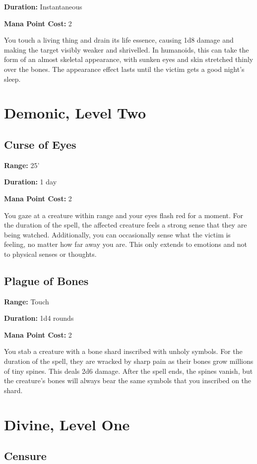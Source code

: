 \begin{multicols}{2}
\textbf{Duration:} Instantaneous

\textbf{Mana Point Cost:} 2

You touch a living thing and drain its life essence, causing 1d8
damage and making the target visibly weaker and shrivelled. In
humanoids, this can take the form of an almost skeletal appearance,
with sunken eyes and skin stretched thinly over the bones. The
appearance effect lasts until the victim gets a good night's sleep.

\section{Demonic, Level Two}

\subsection{Curse of Eyes}

\textbf{Range:} 25'

\textbf{Duration:} 1 day

\textbf{Mana Point Cost:} 2

You gaze at a creature within range and your eyes flash red for a
moment. For the duration of the spell, the affected creature feels
a strong sense that they are being watched. Additionally, you can
occasionally sense what the victim is feeling, no matter how far
away you are. This only extends to emotions and not to physical
senses or thoughts.

\subsection{Plague of Bones}

\textbf{Range:} Touch

\textbf{Duration:} 1d4 rounds

\textbf{Mana Point Cost:} 2

You stab a creature with a bone shard inscribed with unholy symbols.
For the duration of the spell, they are wracked by sharp pain as
their bones grow millions of tiny spines. This deals 2d6 damage.
After the spell ends, the spines vanish, but the creature's bones
will always bear the same symbols that you inscribed on the shard.

\section{Divine, Level One}

\subsection{Censure}


\end{multicols}
